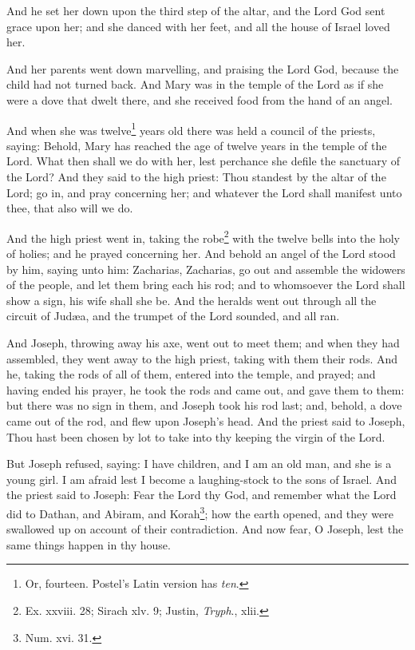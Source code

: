 \pend\pstart
And he set her down upon the third step of the altar, and the Lord God sent grace upon her; and she danced with her feet, and all the house of Israel loved her.

\pend\pstart
{}

\pend\pstart
And her parents went down marvelling, and praising the Lord God, because the child had not turned back. And Mary was in the temple of the Lord as if she were a dove that dwelt there, and she received food from the hand of an angel.

\pend\pstart
And when she was twelve\footnote{Or, fourteen. Postel's Latin version has \textit{ten}.} years old there was held a council of the priests, saying: Behold, Mary has reached the age of twelve years in the temple of the Lord. What then shall we do with her, lest perchance she defile the sanctuary of the Lord? And they said to the high priest: Thou standest by the altar of the Lord; go in, and pray concerning her; and whatever the Lord shall manifest unto thee, that also will we do.

\pend\pstart
And the high priest went in, taking the robe\footnote{Ex. xxviii. 28; Sirach xlv. 9; Justin, \textit{Tryph}., xlii.} with the twelve bells into the holy of holies; and he prayed concerning her. And behold an angel of the Lord stood by him, saying unto him: Zacharias, Zacharias, go out and assemble the widowers of the people, and let them bring each his rod; and to whomsoever the Lord shall show a sign, his wife shall she be. And the heralds went out through all the circuit of Judæa, and the trumpet of the Lord sounded, and all ran.

\pend\pstart
{}

\pend\pstart
And Joseph, throwing away his axe, went out to meet them; and when they had assembled, they went away to the high priest, taking with them their rods. And he, taking the rods of all of them, entered into the temple, and prayed; and having ended his prayer, he took the rods and came out, and gave them to them: but there was no sign in them, and Joseph took his rod last; and, behold, a dove came out of the rod, and flew upon Joseph's head. And the priest said to Joseph, Thou hast been chosen by lot to take into thy keeping the virgin of the Lord.

\pend\pstart
But Joseph refused, saying: I have children, and I am an old man, and she is a young girl. I am afraid lest I become a laughing-stock to the sons of Israel. And the priest said to Joseph: Fear the Lord thy God, and remember what the Lord did to Dathan, and Abiram, and Korah\footnote{Num. xvi. 31.}; how the earth opened, and they were swallowed up on account of their contradiction. And now fear, O Joseph, lest the same things happen in thy house.

